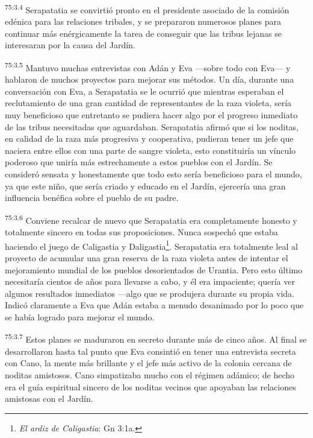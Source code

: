 \par
\textsuperscript{75:3.4} Serapatatia se convirtió pronto en el presidente asociado de la comisión edénica para las relaciones tribales, y se prepararon numerosos planes para continuar más enérgicamente la tarea de conseguir que las tribus lejanas se interesaran por la causa del Jardín.

\par
\textsuperscript{75:3.5} Mantuvo muchas entrevistas con Adán y Eva ---sobre todo con Eva--- y hablaron de muchos proyectos para mejorar sus métodos. Un día, durante una conversación con Eva, a Serapatatia se le ocurrió que mientras esperaban el reclutamiento de una gran cantidad de representantes de la raza violeta, sería muy beneficioso que entretanto se pudiera hacer algo por el progreso inmediato de las tribus necesitadas que aguardaban. Serapatatia afirmó que si los noditas, en calidad de la raza más progresiva y cooperativa, pudieran tener un jefe que naciera entre ellos con una parte de sangre violeta, esto constituiría un vínculo poderoso que uniría más estrechamente a estos pueblos con el Jardín. Se consideró sensata y honestamente que todo esto sería beneficioso para el mundo, ya que este niño, que sería criado y educado en el Jardín, ejercería una gran influencia benéfica sobre el pueblo de su padre.

\par
\textsuperscript{75:3.6} Conviene recalcar de nuevo que Serapatatia era completamente honesto y totalmente sincero en todas sus proposiciones. Nunca sospechó que estaba haciendo el juego de Caligastia y Daligastia\footnote{\textit{El ardiz de Caligastia}: Gn 3:1a.}. Serapatatia era totalmente leal al proyecto de acumular una gran reserva de la raza violeta antes de intentar el mejoramiento mundial de los pueblos desorientados de Urantia. Pero esto último necesitaría cientos de años para llevarse a cabo, y él era impaciente; quería ver algunos resultados inmediatos ---algo que se produjera durante su propia vida. Indicó claramente a Eva que Adán estaba a menudo desanimado por lo poco que se había logrado para mejorar el mundo.

\par
\textsuperscript{75:3.7} Estos planes se maduraron en secreto durante más de cinco años. Al final se desarrollaron hasta tal punto que Eva consintió en tener una entrevista secreta con Cano, la mente más brillante y el jefe más activo de la colonia cercana de noditas amistosos. Cano simpatizaba mucho con el régimen adámico; de hecho era el guía espiritual sincero de los noditas vecinos que apoyaban las relaciones amistosas con el Jardín.


